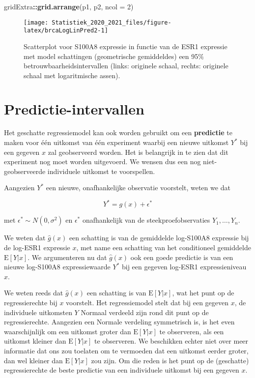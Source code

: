 \documentclass[
  12pt,dutch,coursenotes]{book}
\newenvironment{Shaded}{\begin{snugshade}}{\end{snugshade}}
\newcommand{\DataTypeTok}[1]{\textcolor[rgb]{0.13,0.29,0.53}{#1}}
\newcommand{\DecValTok}[1]{\textcolor[rgb]{0.00,0.00,0.81}{#1}}
\newcommand{\KeywordTok}[1]{\textcolor[rgb]{0.13,0.29,0.53}{\textbf{#1}}}
\newcommand{\NormalTok}[1]{#1}
\newcommand{\OperatorTok}[1]{\textcolor[rgb]{0.81,0.36,0.00}{\textbf{#1}}}
\theoremstyle{definition}
\theoremstyle{definition}
\theoremstyle{definition}
\theoremstyle{remark}
\begin{document}
\begin{Shaded}
\begin{Highlighting}[]
\NormalTok{gridExtra}\OperatorTok{::}\KeywordTok{grid.arrange}\NormalTok{(p1, p2, }\DataTypeTok{ncol =} \DecValTok{2}\NormalTok{)}
\end{Highlighting}
\end{Shaded}

\begin{figure}

{\centering \texttt{[image: Statistiek\_2020\_2021\_files/figure-latex/brcaLogLinPred2-1]} 

}

\caption{Scatterplot voor S100A8 expressie in functie van de ESR1 expressie met model schattingen (geometrische gemiddeldes) een 95$\%$ betrouwbaarheidsintervallen (links: originele schaal, rechts: originele schaal met logaritmische assen).}\label{fig:brcaLogLinPred2}
\end{figure}

\hypertarget{predictie-intervallen}{%
\section{Predictie-intervallen}\label{predictie-intervallen}}

Het geschatte regressiemodel kan ook worden gebruikt om een \textbf{predictie} te maken voor één uitkomst van één experiment waarbij een nieuwe uitkomst \(Y^*\) bij een gegeven \(x\) zal geobserveerd worden. Het is belangrijk in te zien dat dit experiment nog moet worden uitgevoerd. We wensen dus een nog niet-geobserveerde individuele uitkomst te voorspellen.

Aangezien \(Y^*\) een nieuwe, onafhankelijke observatie voorstelt, weten we dat

\[
  Y^* = g(x) + \epsilon^*
\]

met \(\epsilon^*\sim N(0,\sigma^2)\) en \(\epsilon^*\) onafhankelijk van de steekproefobservaties \(Y_1,\ldots, Y_n\).

We weten dat \(\hat{g}(x)\) een schatting is van de gemiddelde log-S100A8 expressie bij de log-ESR1 expressie \(x\), met name een schatting van het conditioneel gemiddelde \(\text{E}[Y\vert x]\). We argumenteren nu dat \(\hat{g}(x)\) ook een goede predictie is van een nieuwe log-S100A8 expressiewaarde \(Y^*\) bij een gegeven log-ESR1 expressieniveau \(x\).

We weten reeds dat \(\hat{g}(x)\) een schatting is van \(\text{E}[Y\vert x]\), wat het punt op de regressierechte bij \(x\) voorstelt. Het regressiemodel stelt dat bij een gegeven \(x\), de individuele uitkomsten \(Y\) Normaal verdeeld zijn rond dit punt op de regressierechte. Aangezien een Normale verdeling symmetrisch is, is het even waarschijnlijk om een uitkomst groter dan \(\text{E}[Y\vert x]\) te observeren, als een uitkomst kleiner dan \(\text{E}[Y\vert x]\) te observeren. We beschikken echter niet over meer informatie dat ons zou toelaten om te vermoeden dat een uitkomst eerder groter, dan wel kleiner dan \(\text{E}[Y\vert x]\) zou zijn. Om die reden is het punt op de (geschatte) regressierechte de beste predictie van een individuele uitkomst bij een gegeven \(x\).
\end{document}
